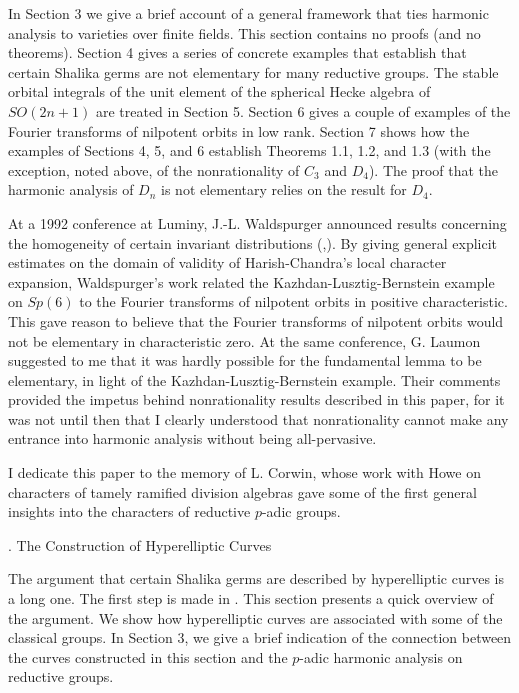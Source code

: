 In Section 3 we give a brief account of a general framework that
ties harmonic analysis to varieties over finite fields.  This section
contains no proofs (and no theorems).  Section 4 gives a series
of concrete examples that establish that certain Shalika
germs are not elementary for many reductive groups.  The stable orbital integrals
of the unit element of the spherical 
Hecke algebra of $SO(2n+1)$ are
treated in Section 5.  Section 6 gives a couple of examples of the
Fourier transforms of nilpotent orbits in low rank.  Section 7 shows
how the examples of Sections 4, 5, and 6 establish Theorems 1.1, 1.2,
and 1.3 
(with the exception, noted above, of the nonrationality of $C_3$ and $D_4$).
The proof that the harmonic analysis of
$D_n$ is not elementary relies on the result for $D_4$.

At a 1992 conference at Luminy, J.-L. Waldspurger announced
results concerning the homogeneity of certain invariant distributions
(\cite{W2},\cite{W3}).  By giving general explicit estimates on the domain of
validity of Harish-Chandra's local character expansion, Waldspurger's
work related the Kazhdan-Lusztig-Bernstein example on $Sp(6)$ to the
Fourier transforms of nilpotent orbits in positive characteristic.
This gave reason to believe that the Fourier transforms of nilpotent
orbits would not be elementary in characteristic zero. 
At the same conference, G. Laumon suggested to me that 
it was hardly possible for the fundamental lemma to be elementary,
in light of the
Kazhdan-Lusztig-Bernstein example.  Their comments provided the
impetus behind nonrationality results described in this paper, for
it was not until then that I clearly understood that 
nonrationality cannot make any entrance into harmonic
analysis without being all-pervasive.

I dedicate this paper to the memory of L. Corwin, 
whose work with Howe on characters of
tamely ramified division algebras gave
some of the first general
insights into the characters of reductive
$p$-adic groups.

.  The Construction of Hyperelliptic Curves\endhead

The argument that certain Shalika germs are described
by hyperelliptic curves
is a long one.  The first step is made in \cite{H3}.  This
section presents a quick overview of the argument.  We show how
hyperelliptic curves are associated with some of the
classical groups.  In Section 3, we 
give a brief indication of the
connection between the curves constructed in this section and
the $p$-adic harmonic analysis on reductive groups.

